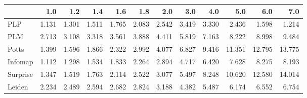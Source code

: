 \begin{tabular}{lrrrrrrrrrrr}
\toprule
{} &   1.0 &   1.2 &   1.4 &   1.6 &   1.8 &   2.0 &   3.0 &   4.0 &    5.0 &    6.0 &    7.0 \\
\midrule
PLP      & 1.131 & 1.301 & 1.511 & 1.765 & 2.083 & 2.542 & 3.419 & 3.330 &  2.436 &  1.598 &  1.214 \\
PLM      & 2.713 & 3.108 & 3.318 & 3.561 & 3.888 & 4.411 & 5.819 & 7.163 &  8.222 &  8.998 &  9.484 \\
Potts    & 1.399 & 1.596 & 1.866 & 2.322 & 2.992 & 4.077 & 6.827 & 9.416 & 11.351 & 12.795 & 13.775 \\
Infomap  & 1.112 & 1.298 & 1.534 & 1.833 & 2.264 & 2.894 & 4.717 & 6.420 &  7.628 &  8.275 &  8.193 \\
Surprise & 1.347 & 1.519 & 1.763 & 2.114 & 2.522 & 3.077 & 5.497 & 8.248 & 10.620 & 12.580 & 14.014 \\
Leiden   & 2.234 & 2.489 & 2.594 & 2.682 & 2.824 & 3.188 & 4.382 & 5.487 &  6.174 &  6.552 &  6.754 \\
\bottomrule
\end{tabular}
